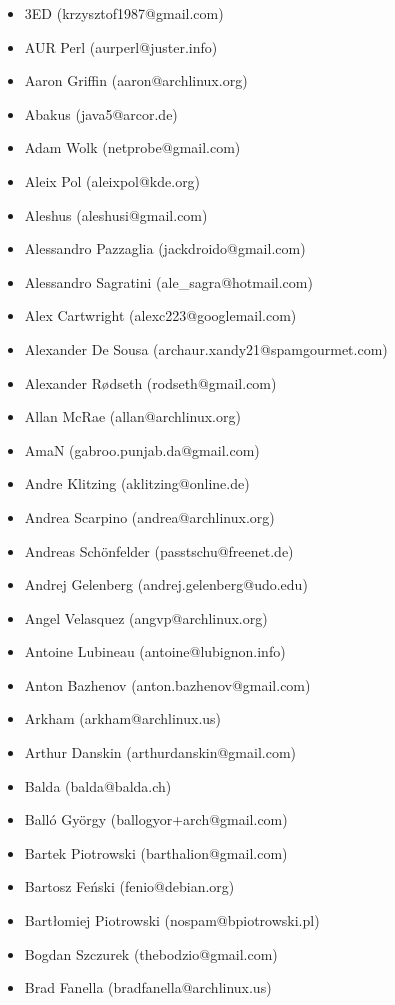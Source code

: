 \begin{latin}
\begin{itemize}
\item  3ED (krzysztof1987@gmail.com)
\item  AUR Perl (aurperl@juster.info)
\item  Aaron Griffin (aaron@archlinux.org)
\item  Abakus (java5@arcor.de)
\item  Adam Wolk (netprobe@gmail.com)
\item  Aleix Pol (aleixpol@kde.org)
\item  Aleshus (aleshusi@gmail.com)
\item  Alessandro Pazzaglia (jackdroido@gmail.com)
\item  Alessandro Sagratini (ale\_sagra@hotmail.com)
\item  Alex Cartwright (alexc223@googlemail.com)
\item  Alexander De Sousa (archaur.xandy21@spamgourmet.com)
\item  Alexander Rødseth (rodseth@gmail.com)
\item  Allan McRae (allan@archlinux.org)
\item  AmaN (gabroo.punjab.da@gmail.com)
\item  Andre Klitzing (aklitzing@online.de)
\item  Andrea Scarpino (andrea@archlinux.org)
\item  Andreas Schönfelder (passtschu@freenet.de)
\item  Andrej Gelenberg (andrej.gelenberg@udo.edu)
\item  Angel Velasquez (angvp@archlinux.org)
\item  Antoine Lubineau (antoine@lubignon.info)
\item  Anton Bazhenov (anton.bazhenov@gmail.com)
\item  Arkham (arkham@archlinux.us)
\item  Arthur Danskin (arthurdanskin@gmail.com)
\item  Balda (balda@balda.ch)
\item  Balló György (ballogyor+arch@gmail.com)
\item  Bartek Piotrowski (barthalion@gmail.com)
\item  Bartosz Feński (fenio@debian.org)
\item  Bartłomiej Piotrowski (nospam@bpiotrowski.pl)
\item  Bogdan Szczurek (thebodzio@gmail.com)
\item  Brad Fanella (bradfanella@archlinux.us)

\end{itemize}
\end{latin}
